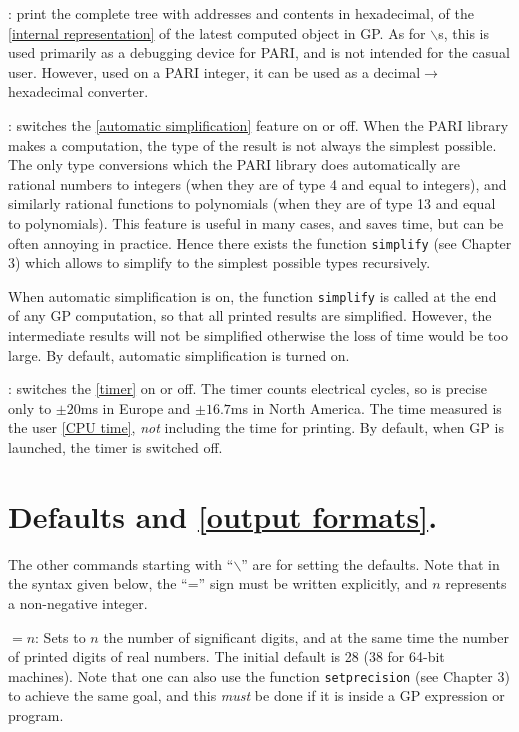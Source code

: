 : print the complete tree with
addresses and contents in hexadecimal, of the \ref{internal representation} of
the latest computed object in GP. As for $\backslash$s, this is used primarily
as a debugging device for PARI, and is not intended for the casual user.
However, used on a PARI integer, it can be used as a 
decimal$\rightarrow$hexadecimal converter.

: switches the \ref{automatic simplification}
feature on or off. When the PARI library makes a computation, the type of the
result is not always the simplest possible. The only type conversions which
the PARI library does automatically are rational numbers to integers (when
they are of type 4 and equal to integers), and similarly rational functions
to polynomials (when they are of type 13 and equal to polynomials). This
feature is useful in many cases, and saves time, but can be often annoying
in practice. Hence there exists the function {\tt simplify} (see Chapter 3)
which allows to simplify to the simplest possible types recursively.

When automatic simplification is on, the function {\tt simplify} is called
at the end of any GP computation, so that all printed results are simplified.
However, the intermediate results will not be simplified otherwise the loss
of time would be too large. By default, automatic simplification is turned
on. 

\subsec{\#}: switches the \ref{timer} on or off. The timer counts electrical
cycles, so is precise only to $\pm20$ms in Europe and $\pm16.7$ms in North 
America. The time measured is the user \ref{CPU time}, {\it not} including the
time for printing. By default, when GP is launched, the timer is switched off.

\section{Defaults and \ref{output formats}.}

The other commands starting with ``$\backslash$'' are for setting the
defaults.
Note that in the syntax given below, the ``='' sign must be written
explicitly, and $n$ represents a non-negative integer.

\subsec{$\backslash$\ref{precision}}$=n$:
Sets to $n$ the number of significant digits, and at the same time the
number of printed digits of real numbers. The initial default is 28 (38
for 64-bit machines).
Note that one can also use the function {\tt setprecision} (see Chapter 3)
to achieve the same goal, and this {\sl must} be done if it is inside a
GP expression or program.

